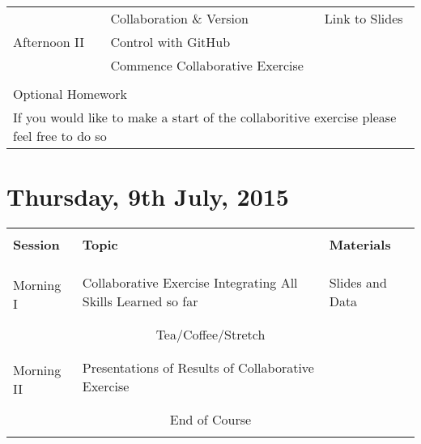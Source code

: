 \documentclass{article}[12pt]
\begin{document}
\begin{table}[h!]
\begin{tabular}{ |p{2cm}|p{4cm}|p{7cm}| }
\multirow{3}{*}{Afternoon II}  & Collaboration \& Version    & Link to Slides \\
                              & Control with GitHub         &  \\
                              & Commence Collaborative Exercise &  \\ \hline \hline
\multicolumn{3}{l}{} \\
\multicolumn{3}{l}{Optional Homework} \\
\multicolumn{3}{l}{If you would like to make a start of the collaboritive exercise please feel free to do so}
\end{tabular}
\end{table}

\clearpage
\section*{Thursday, 9th July, 2015}
\begin{table}[h!]
\begin{tabular}{ |p{2cm}|p{4cm}|p{7cm}| }
\hline
                               &                              & \\
\textbf{Session}               & \textbf{Topic}               & \textbf{Materials} \\ 
                               &                              & \\ \hline \hline
 & & \\



 & & \\
\multirow{2}{*}{Morning I }      & Collaborative Exercise Integrating All Skills Learned so far & Slides and Data \\
                              &               & \\ \hline 
\multicolumn{3}{c}{} \\ 
\multicolumn{3}{c}{Tea/Coffee/Stretch}  \\ 
\multicolumn{3}{c}{} \\ \hline
 & & \\
\multirow{2}{*}{Morning II}      & Presentations of Results of Collaborative Exercise      & \\
 & & \\ \hline
\multicolumn{3}{c}{} \\
\multicolumn{3}{c}{End of Course}  \\ 
\multicolumn{3}{c}{} \\
\end{tabular}
\end{table}
\end{document}
